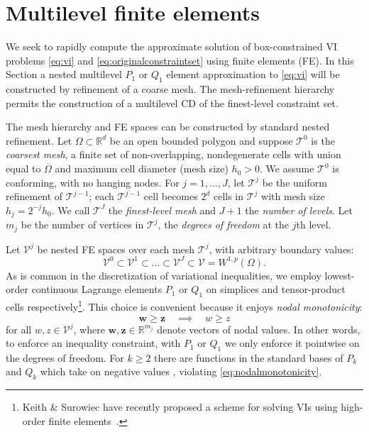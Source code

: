 \documentclass[review,hidelinks,onefignum,onetabnum,final]{siamart220329}  %
\newcommand{\RR}{\mathbb{R}}
\newcommand{\bw}{\mathbf{w}}
\newcommand{\bz}{\mathbf{z}}
\begin{document}
\section{Multilevel finite elements} \label{sec:femultilevel}

We seek to rapidly compute the approximate solution of box-constrained VI problems \eqref{eq:vi} and \eqref{eq:originalconstraintset} using finite elements (FE).  In this Section a nested multilevel $P_1$ or $Q_1$ element \cite{Elmanetal2014} approximation to \eqref{eq:vi} will be constructed by refinement of a coarse mesh.  The mesh-refinement hierarchy permits the construction of a multilevel CD of the finest-level constraint set.

The mesh hierarchy and FE spaces can be constructed by standard nested refinement.  Let $\Omega \subset \RR^d$ be an open bounded polygon and suppose $\mathcal{T}^0$ is the \emph{coarsest mesh}, a finite set of non-overlapping, nondegenerate cells with union equal to $\overline{\Omega}$ and maximum cell diameter (mesh size) $h_0>0$.  We assume $\mathcal{T}^0$ is conforming, with no hanging nodes.  For $j=1,\dots,J$, let $\mathcal{T}^j$ be the uniform refinement of $\mathcal{T}^{j-1}$; each $\mathcal{T}^{j-1}$ cell becomes $2^d$ cells in $\mathcal{T}^j$ with mesh size $h_j = 2^{-j} h_0$.  We call $\mathcal{T}^J$ the \emph{finest-level mesh} and $J+1$ the \emph{number of levels}.  Let $m_j$ be the number of vertices in $\mathcal{T}^j$, the \emph{degrees of freedom} at the $j$th level.

Let $\mathcal{V}^j$ be nested FE spaces over each mesh $\mathcal{T}^j$, with arbitrary boundary values:
\begin{equation}
\mathcal{V}^0 \subset \mathcal{V}^1 \subset \dots \subset \mathcal{V}^J \subset \mathcal{V}=W^{1,p}(\Omega).  \label{eq:fe:nestedspaces}
\end{equation}
As is common in the discretization of variational inequalities, we employ lowest-order continuous Lagrange elements $P_1$ or $Q_1$ on simplices and tensor-product cells respectively\footnote{Keith \& Surowiec have recently proposed a scheme for solving VIs using high-order finite elements~\cite{Keith2023}.}. This choice is convenient because it enjoys \emph{nodal monotonicity}:
\begin{equation}
\bw \ge \bz \quad \implies \quad w \ge z \label{eq:nodalmonotonicity}
\end{equation}
for all $w,z \in \mathcal{V}^j$, where $\bw,\bz \in \RR^{m_j}$ denote vectors of nodal values. In other words, to enforce an inequality constraint, with $P_1$ or $Q_1$ we only enforce it pointwise on the degrees of freedom. For $k\ge 2$ there are functions in the standard bases of $P_k$ and $Q_k$ which take on negative values \cite[Figure 1.7]{Elmanetal2014}, violating \eqref{eq:nodalmonotonicity}.
\end{document}
